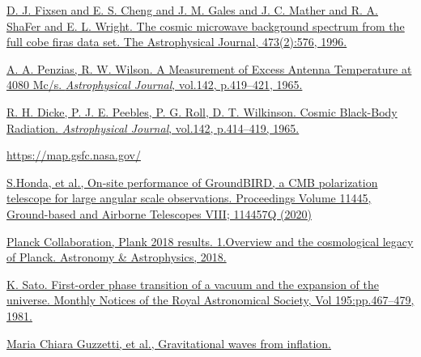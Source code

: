 \begin{thebibliography}{99}

\href{D. J. Fixsen and E. S. Cheng and J. M. Gales and J. C. Mather and R. A. ShaFer and E. L. Wright. The cosmic microwave background spectrum from the full cobe firas data set. The Astrophysical Journal, 473(2):576, 1996.}{
D. J. Fixsen and E. S. Cheng and J. M. Gales and J. C. Mather and R. A. ShaFer and E. L. Wright. The cosmic microwave background spectrum from the full cobe firas data set. The Astrophysical Journal, 473(2):576, 1996.
}

\href{https://ui.adsabs.harvard.edu/abs/1965ApJ...142..419P/abstract}{
A. A. Penzias, R. W. Wilson. A Measurement of Excess Antenna Temperature at 4080 Mc/s. {\it Astrophysical Journal}, vol.142, p.419–421, 1965.
}

\href{https://ui.adsabs.harvard.edu/abs/1965ApJ...142..414D/abstrac}{
R. H. Dicke, P. J. E. Peebles, P. G. Roll, D. T. Wilkinson. Cosmic Black-Body Radiation. {\it Astrophysical Journal}, vol.142, p.414–419, 1965.
}


\href{https://map.gsfc.nasa.gov/}{
https://map.gsfc.nasa.gov/
}
\fi

\href{https://www.spiedigitallibrary.org/conference-proceedings-of-spie/11445/114457Q/On-site-performance-of-GroundBIRD-a-CMB-polarization-telescope-for/10.1117/12.2560918.short}
{S.Honda, et al., On-site performance of GroundBIRD, a CMB polarization telescope for large angular scale observations. Proceedings Volume 11445, Ground-based and Airborne Telescopes VIII; 114457Q (2020)}


\href{https://www.aanda.org/articles/aa/full\_html/2020/09/aa33880-18/aa33880-18.html}
{Planck Collaboration, Plank 2018 results. 1.Overview and the cosmological legacy of Planck. Astronomy \& Astrophysics, 2018.}

\href{https://ui.adsabs.harvard.edu/abs/1981MNRAS.195..467S/abstract}
{K. Sato. First-order phase transition of a vacuum and the expansion of the universe. Monthly Notices of the Royal Astronomical Society, Vol 195:pp.467–479, 1981.}


\href{https://arxiv.org/abs/1605.01615}
{Maria Chiara Guzzetti, et al., Gravitational waves from inflation.}


\end{thebibliography}
